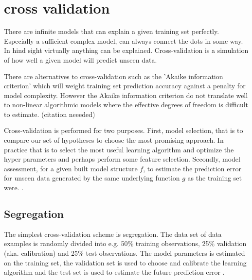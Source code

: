 \section{cross validation}
There are infinite models that can explain a given training set perfectly. Especially a sufficient complex model, can always connect the dots in some way. In hind sight virtually anything can be explained. Cross-validation is a simulation of how well a given model will predict unseen data.

There are alternatives to cross-validation such as the 'Akaike information criterion' which will weight training set prediction accuracy against a penalty for model complexity. However the Akaike information criterion do not translate well to non-linear algorithmic models where the effective degrees of freedom is difficult to estimate. (citation neeeded)

Cross-validation is performed for two purposes. First, model selection, that is to compare our set of hypotheses to choose the most promising approach. In practice that is to select the most useful learning algorithm and optimize the hyper parameters and perhaps perform some feature selection. Secondly, model assessment, for a given built model structure $f$, to estimate the prediction error for unseen data generated by the same underlying function $g$ as the training set were. \cite{friedman2001elements}.

\subsection{Segregation}
The simplest cross-validation scheme is segregation. The data set of data examples is randomly divided into e.g. 50\% training observations, 25\% validation (aka. calibration) and 25\% test observations. The model parameters is estimated on the training set, the validation set is used to choose and calibrate the learning algorithm and the test set is used to estimate the future prediction error \cite{friedman2001elements}.

